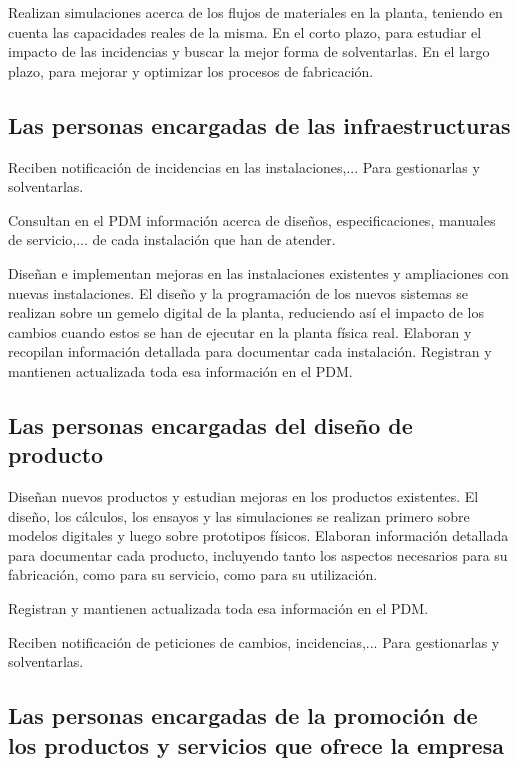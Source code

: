 \documentclass[spanish,12pt,a4paper,final,oneside]{book}
\begin{document}
Realizan simulaciones acerca de los flujos de materiales en la planta, teniendo en cuenta las capacidades reales de la misma. En el corto plazo, para estudiar el impacto de las incidencias y buscar la mejor forma de solventarlas. En el largo plazo, para mejorar y optimizar los procesos de fabricación.

\subsection{Las personas encargadas de las infraestructuras}

Reciben notificación de incidencias en las instalaciones,... Para gestionarlas y solventarlas.

Consultan en el PDM información acerca de diseños, especificaciones, manuales de servicio,... de cada instalación que han de atender.

Diseñan e implementan mejoras en las instalaciones existentes y ampliaciones con nuevas instalaciones. El diseño y la programación de los nuevos sistemas se realizan sobre un gemelo digital de la planta, reduciendo así el impacto de los cambios cuando estos se han de ejecutar en la planta física real.  Elaboran y recopilan información detallada para documentar cada instalación. Registran y mantienen actualizada toda esa información en el PDM.

\subsection{Las personas encargadas del diseño de producto}

Diseñan nuevos productos y estudian mejoras en los productos existentes. El diseño, los cálculos, los ensayos y las simulaciones se realizan primero sobre modelos digitales y luego sobre prototipos físicos.  Elaboran información detallada para documentar cada producto, incluyendo tanto los aspectos necesarios para su fabricación, como para su servicio, como para su utilización. 

Registran y mantienen actualizada toda esa información en el PDM.

Reciben notificación de peticiones de cambios, incidencias,... Para gestionarlas y solventarlas.

\subsection{Las personas encargadas de la promoción de los productos y servicios que ofrece la empresa}
\end{document}

